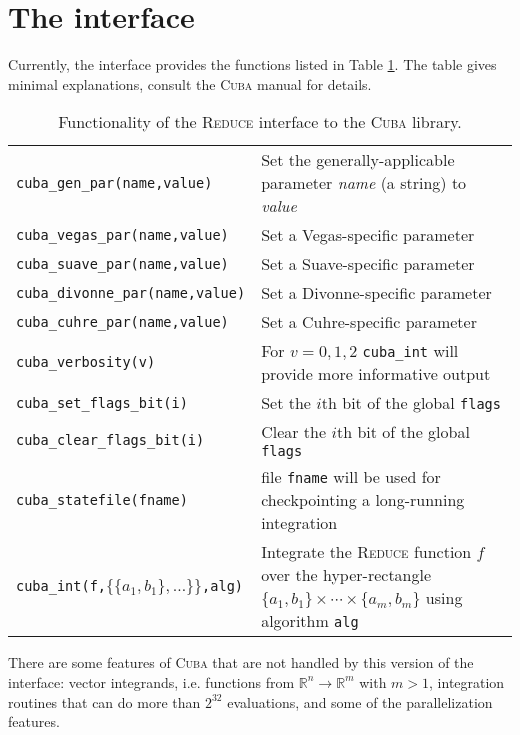 \documentclass[11pt]{article}
\newcommand{\Reduce}{\textsc{Reduce}}
\newcommand{\Cuba}{\textsc{Cuba}}
\begin{document}
\section{The interface}

Currently, the interface provides the functions listed in Table \ref{tab:intf}.
The table gives minimal explanations, consult the {\Cuba} manual for details.
\begin{table}[h]
  \centering
  \begin{tabular}{|l|p{}|}\hline
    \texttt{cuba\_gen\_par(name,value)} & Set the generally-applicable parameter
      \emph{name} (a string) to \emph{value} \\
    \texttt{cuba\_vegas\_par(name,value)}  &   Set a Vegas-specific parameter \\
    \texttt{cuba\_suave\_par(name,value)}  &   Set a Suave-specific parameter \\
    \texttt{cuba\_divonne\_par(name,value)} &  Set a Divonne-specific parameter \\
    \texttt{cuba\_cuhre\_par(name,value)}   &  Set a Cuhre-specific parameter \\
    \hline
    \texttt{cuba\_verbosity(v)}  & For $v=0,1,2$ \texttt{cuba\_int} will provide
    more informative output \\
    \hline
    \texttt{cuba\_set\_flags\_bit(i)}      & Set the $i$th bit of the global
    \texttt{flags} \\
    \texttt{cuba\_clear\_flags\_bit(i)}    & Clear the $i$th bit of the global
    \texttt{flags} \\
    \texttt{cuba\_statefile(fname)} & file \texttt{fname} will be used for
    checkpointing a long-running integration \\
    \hline
    \texttt{cuba\_int(f,$\{\{a_1,b_1\},\dots\}\}$,alg)}    & Integrate
    the {\Reduce} function $f$ over the hyper-rectangle
    $\{a_1,b_1\}\times\cdots\times\{a_m,b_m\}$ using algorithm \texttt{alg} \\
      \hline
  \end{tabular}
  \caption{\label{tab:intf}Functionality of the {\Reduce} interface to the
    {\Cuba} library.}
\end{table}

There are some features of {\Cuba} that are not handled by this version of the
interface: vector integrands, i.e. functions from $\mathbb{R}^n\to\mathbb{R}^m$
with $m>1$, integration routines that can do more than $2^{32}$ evaluations, and
some of the parallelization features.
\clearpage
\end{document}
